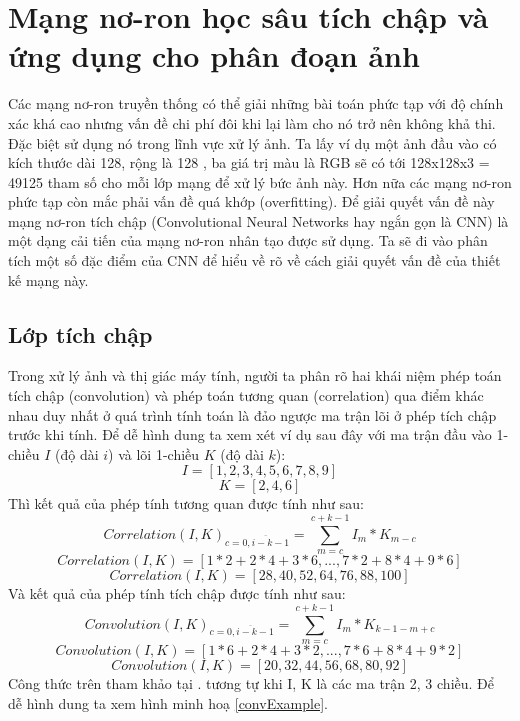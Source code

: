 \section{Mạng nơ-ron học sâu tích chập và ứng dụng cho phân đoạn ảnh}
Các mạng nơ-ron truyền thống có thể giải những bài toán phức tạp với độ chính xác khá cao nhưng vấn đề chi phí đôi khi lại làm cho nó trở nên không khả thi. Đặc biệt sử dụng nó trong lĩnh vực xử lý ảnh. Ta lấy ví dụ một ảnh đầu vào có kích thước dài 128, rộng là 128 , ba giá trị màu là RGB sẽ có tới 128x128x3 = 49125 tham số cho mỗi lớp mạng để xử lý bức ảnh này. Hơn nữa các mạng nơ-ron phức tạp còn mắc phải vấn đề quá khớp (overfitting). Để giải quyết vấn đề này mạng nơ-ron tích chập (Convolutional Neural Networks hay ngắn gọn là CNN) là một dạng cải tiến của mạng nơ-ron nhân tạo được sử dụng. Ta sẽ đi vào phân tích một số đặc điểm của CNN để hiểu về rõ về cách giải quyết vấn đề của thiết kế mạng này.



\subsection{Lớp tích chập}
Trong xử lý ảnh và thị giác máy tính, người ta phân rõ hai khái niệm phép toán tích chập (convolution) và phép toán tương quan (correlation) qua điểm khác nhau duy nhất ở quá trình tính toán là đảo ngược ma trận lõi ở phép tích chập trước khi tính. Để dễ hình dung ta xem xét ví dụ sau đây với ma trận đầu vào 1-chiều $I$ (độ dài $i$) và lõi 1-chiều $K$ (độ dài $k$):
$$ I = [1, 2, 3, 4, 5, 6, 7, 8, 9]$$
$$ K = [2, 4, 6] $$
Thì kết quả của phép tính tương quan được tính như sau:
$$ Correlation(I,K)_{c = \overline{0, i - k - 1}} = \sum_{m=c}^{c + k-1}I_{m}*K_{m-c}$$
$$ Correlation(I,K) = [1*2 + 2*4 + 3*6, ... , 7*2 + 8*4 + 9*6] $$
$$ Correlation(I,K) = [28,  40,  52,  64,  76,  88, 100] $$
Và kết quả của phép tính tích chập được tính như sau:
$$ Convolution(I,K)_{c = \overline{0, i - k - 1}} = \sum_{m=c}^{c + k-1}I_{m}*K_{k - 1 - m + c}$$
$$ Convolution(I,K) = [1*6 + 2*4 + 3*2, ... , 7*6 + 8*4 + 9*2] $$
$$ Convolution(I,K) = [20, 32, 44, 56, 68, 80, 92] $$
Công thức trên tham khảo tại \cite{convSlide}. tương tự khi I, K là các ma trận 2, 3 chiều. Để dễ hình dung ta xem hình minh hoạ \ref{convExample}.

